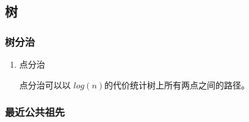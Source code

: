 \documentclass[11pt]{article}
\begin{document}
\subsection{树}
\label{sec-2-2}
\subsubsection{树分治}
\label{sec-2-2-1}
\begin{enumerate}
\item 点分治
\label{sec-2-2-1-1}

点分治可以以 \(log(n)\)的代价统计树上所有两点之间的路径。
\end{enumerate}
\subsubsection{最近公共祖先}
\label{sec-2-2-2}
\end{document}
